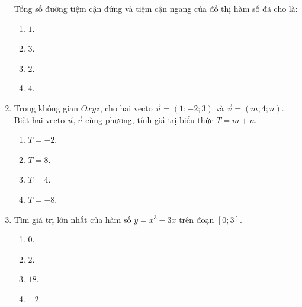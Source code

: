 \documentclass[12pt]{article}
\begin{document}
\begin{enumerate}[label=\textbf{Câu \arabic*.}, leftmargin=*]
\begin{center}
		\end{center}
		Tổng số đường tiệm cận đứng và tiệm cận ngang của đồ thị hàm số đã cho là:
		\begin{multicols}{4}
			\begin{enumerate}[label=\Alph*.]
				\item $1$.
				\item $3$.
				\item $2$.
				\item $4$.
			\end{enumerate}
		\end{multicols}
		
		\item Trong không gian $Oxyz$, cho hai vecto $\vec{u} = (1; -2; 3)$ và $\vec{v} = (m; 4; n)$. Biết hai vecto $\vec{u}, \vec{v}$ cùng phương, tính giá trị biểu thức $T = m + n$.
		\begin{multicols}{4}
			\begin{enumerate}[label=\Alph*.]
				\item $T = -2$.
				\item $T = 8$.
				\item $T = 4$.
				\item $T = -8$.
			\end{enumerate}
		\end{multicols}
		
		\item Tìm giá trị lớn nhất của hàm số $y = x^3 - 3x$ trên đoạn $[0; 3]$.
		\begin{multicols}{4}
			\begin{enumerate}[label=\Alph*.]
				\item $0$.
				\item $2$.
				\item $18$.
				\item $-2$.
			\end{enumerate}
		\end{multicols}
		

\end{enumerate}
\end{document}
